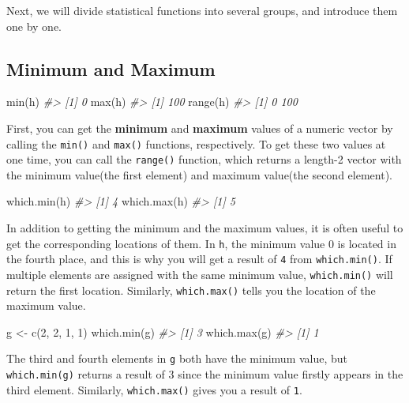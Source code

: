 \documentclass[
]{book}
\newenvironment{Shaded}{\begin{snugshade}}{\end{snugshade}}
\newcommand{\CommentTok}[1]{\textcolor[rgb]{0.56,0.35,0.01}{\textit{#1}}}
\newcommand{\DecValTok}[1]{\textcolor[rgb]{0.00,0.00,0.81}{#1}}
\newcommand{\FunctionTok}[1]{\textcolor[rgb]{0.00,0.00,0.00}{#1}}
\newcommand{\NormalTok}[1]{#1}
\newcommand{\OtherTok}[1]{\textcolor[rgb]{0.56,0.35,0.01}{#1}}
\newenvironment{blackbox}{
  \definecolor{shadecolor}{rgb}{0, 0, 0}  %
  \color{white}
  \begin{shaded}}
 {\end{shaded}}
\newenvironment{infobox}[1]
  {
  \begin{itemize}
  \renewcommand{\labelitemi}{
    \raisebox{-.7\height}[0pt][0pt]{
      {\setkeys{Gin}{width=3em,keepaspectratio}
        \texttt{[image: pics/\#1]}}
    }
  }
  \setlength{\fboxsep}{1em}
  \begin{blackbox}
  \item
  }
  {
  \end{blackbox}
  \end{itemize}
  }
\begin{document}
Next, we will divide statistical functions into several groups, and introduce them one by one.

\hypertarget{minimum-and-maximum}{%
\subsection{Minimum and Maximum}\label{minimum-and-maximum}}

\begin{Shaded}
\begin{Highlighting}[]
\FunctionTok{min}\NormalTok{(h) }
\CommentTok{\#\textgreater{} [1] 0}
\FunctionTok{max}\NormalTok{(h) }
\CommentTok{\#\textgreater{} [1] 100}
\FunctionTok{range}\NormalTok{(h)}
\CommentTok{\#\textgreater{} [1]   0 100}
\end{Highlighting}
\end{Shaded}

First, you can get the \textbf{minimum} and \textbf{maximum} values of a numeric vector by calling the \texttt{min()} and \texttt{max()} functions, respectively. To get these two values at one time, you can call the \texttt{range()} function, which returns a length-2 vector with the minimum value(the first element) and maximum value(the second element).

\begin{Shaded}
\begin{Highlighting}[]
\FunctionTok{which.min}\NormalTok{(h) }
\CommentTok{\#\textgreater{} [1] 4}
\FunctionTok{which.max}\NormalTok{(h) }
\CommentTok{\#\textgreater{} [1] 5}
\end{Highlighting}
\end{Shaded}

In addition to getting the minimum and the maximum values, it is often useful to get the corresponding locations of them. In \texttt{h}, the minimum value 0 is located in the fourth place, and this is why you will get a result of \texttt{4} from \texttt{which.min()}. If multiple elements are assigned with the same minimum value, \texttt{which.min()} will return the first location. Similarly, \texttt{which.max()} tells you the location of the maximum value.

\begin{infobox}{caution}

\begin{Shaded}
\begin{Highlighting}[]
\NormalTok{g }\OtherTok{\textless{}{-}} \FunctionTok{c}\NormalTok{(}\DecValTok{2}\NormalTok{, }\DecValTok{2}\NormalTok{, }\DecValTok{1}\NormalTok{, }\DecValTok{1}\NormalTok{)}
\FunctionTok{which.min}\NormalTok{(g)}
\CommentTok{\#\textgreater{} [1] 3}
\FunctionTok{which.max}\NormalTok{(g)}
\CommentTok{\#\textgreater{} [1] 1}
\end{Highlighting}
\end{Shaded}

The third and fourth elements in \texttt{g} both have the minimum value, but \texttt{which.min(g)} returns a result of 3 since the minimum value firstly appears in the third element. Similarly, \texttt{which.max()} gives you a result of \texttt{1}.

\end{infobox}
\end{document}
